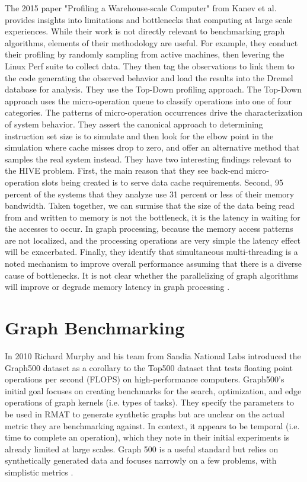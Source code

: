 \par{The 2015 paper "Profiling a Warehouse-scale Computer" from Kanev et al. provides insights into limitations and bottlenecks that computing at large scale experiences. 
While their work is not directly relevant to benchmarking graph algorithms, elements of their methodology are useful. 
For example, they conduct their profiling by randomly sampling from active machines, then levering the Linux Perf suite to collect data.
They then tag the observations to link them to the code generating the observed behavior and load the results into the Dremel database for analysis. 
They use the Top-Down profiling approach. 
The Top-Down approach uses the micro-operation queue to classify operations into one of four categories. 
The patterns of micro-operation occurrences drive the characterization of system behavior. 
They assert the canonical approach to determining instruction set size is to simulate and then look for the elbow point in the simulation where cache misses drop to zero, and offer an alternative method that samples the real system instead. 
They have two interesting findings relevant to the HIVE problem. 
First, the main reason that they see back-end micro-operation slots being created is to serve data cache requirements. 
Second, 95 percent of the systems that they analyze use 31 percent or less of their memory bandwidth. 
Taken together, we can surmise that the size of the data being read from and written to memory is not the bottleneck, it is the latency in waiting for the accesses to occur. 
In graph processing, because the memory access patterns are not localized, and the processing operations are very simple the latency effect will be exacerbated. 
Finally, they identify that simultaneous multi-threading is a noted mechanism to improve overall performance assuming that there is a diverse cause of bottlenecks. 
It is not clear whether the parallelizing of graph algorithms will improve or degrade memory latency in graph processing \cite{Kanev2015}.}



\section{Graph Benchmarking}

\par{In 2010 Richard Murphy and his team from Sandia National Labs introduced the Graph500 dataset as a corollary to the Top500 dataset that tests floating point operations per second (FLOPS) on high-performance computers. 
Graph500's initial goal focuses on creating benchmarks for the search, optimization, and edge operations of graph kernels (i.e. types of tasks).
They specify the parameters to be used in RMAT to generate synthetic graphs but are unclear on the actual metric they are benchmarking against. 
In context, it appears to be temporal (i.e. time to complete an operation), which they note in their initial experiments is already limited at large scales. 
Graph 500 is a useful standard but relies on synthetically generated data and focuses narrowly on a few problems, with simplistic metrics \cite{Murphy2010}.}

